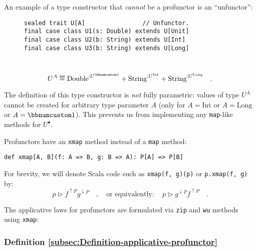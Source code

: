 An example of a type constructor that \emph{cannot} be a profunctor
is an \textsf{``}unfunctor\textsf{''}:

\begin{wrapfigure}{l}{0.47\columnwidth}%
\vspace{-1\baselineskip}

\begin{lstlisting}
sealed trait U[A]                // Unfunctor.
final case class U1(s: Double) extends U[Unit]
final case class U2(b: String) extends U[Int]
final case class U3(b: String) extends U[Long]
\end{lstlisting}

\vspace{0.2\baselineskip}
\end{wrapfigure}%

~\vspace{-0.8\baselineskip}
\[
U^{A}\triangleq\text{Double}^{:U^{\bbnum 1}}+\text{String}^{:U^{\text{Int}}}+\text{String}^{:U^{\text{Long}}}\quad.
\]

\noindent The definition of this type constructor is \emph{not} fully
parametric: values of type $U^{A}$ cannot be created for arbitrary
type parameter $A$ (only for $A=\text{Int}$ or $A=\text{Long}$
or $A=\bbnum 1$). This prevents us from implementing any \lstinline!map!-like
methods for $U^{\bullet}$.

Profunctors have an \lstinline!xmap! method instead of a \lstinline!map!
method:
\begin{lstlisting}
def xmap[A, B](f: A => B, g: B => A): P[A] => P[B]
\end{lstlisting}
 For brevity, we will denote Scala code such as \lstinline!xmap(f, g)(p)!
or \lstinline!p.xmap(f, g)! by:
\[
p\triangleright f^{\uparrow P}g^{\downarrow P}\quad,\quad\text{or equivalently}:\quad p\triangleright g^{\downarrow P}f^{\uparrow P}\quad.
\]

The applicative laws for profunctors are formulated via \lstinline!zip!
and \lstinline!wu! methods using \lstinline!xmap!:

\subsubsection{Definition \label{subsec:Definition-applicative-profunctor}\ref{subsec:Definition-applicative-profunctor}}


